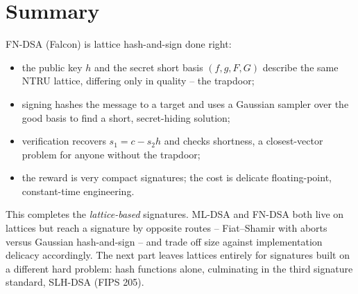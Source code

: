\section{Summary}

FN-DSA (Falcon) is lattice hash-and-sign done right:

\begin{itemize}
  \item the public key $h$ and the secret short basis $(f,g,F,G)$ describe the same NTRU lattice, differing only in quality -- the trapdoor;
  \item signing hashes the message to a target and uses a Gaussian sampler over the good basis to find a short, secret-hiding solution;
  \item verification recovers $s_1=c-s_2 h$ and checks shortness, a closest-vector problem for anyone without the trapdoor;
  \item the reward is very compact signatures; the cost is delicate floating-point, constant-time engineering.
\end{itemize}

This completes the \emph{lattice-based} signatures. ML-DSA and FN-DSA both live on lattices but reach a signature by opposite routes -- Fiat--Shamir with aborts versus Gaussian hash-and-sign -- and trade off size against implementation delicacy accordingly. The next part leaves lattices entirely for signatures built on a different hard problem: hash functions alone, culminating in the third signature standard, SLH-DSA (FIPS 205).

\printbibliography[heading=chapterrefs]

